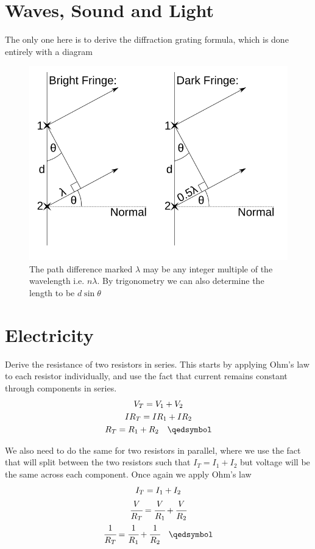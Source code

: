 \documentclass[10pt,a4paper]{article}
\begin{document}
\section{Waves, Sound and Light}
The only one here is to derive the diffraction grating formula, which is done entirely with a diagram

\begin{figure}[h]
    \centering
    \includegraphics[scale = 0.5]{Diffraction.png}
    \caption{The path difference marked $\lambda$ may be any integer multiple of the wavelength i.e. $n\lambda$. By trigonometry we can also determine the length to be $d\sin\theta$}
    \label{fig:my_label}
\end{figure}

\section{Electricity}
Derive the resistance of two resistors in series. This starts by applying Ohm's law to each resistor individually, and use the fact that current remains constant through components in series.
\begin{gather*}
    V_T = V_1 + V_2 \\
    IR_T = IR_1 + IR_2 \\
    R_T = R_1 + R_2 \quad \qedsymbol
\end{gather*}

\newpage
We also need to do the same for two resistors in parallel, where we use the fact that will split between the two resistors such that $I_T = I_1 + I_2$ but voltage will be the same across each component. Once again we apply Ohm's law
\begin{gather*}
    I_T = I_1 + I_2 \\
    \cfrac{V}{R_T} = \cfrac{V}{R_1} + \cfrac{V}{R_2} \\
    \cfrac{1}{R_T} = \cfrac{1}{R_1} + \cfrac{1}{R_2} \quad \qedsymbol
\end{gather*}
\end{document}
